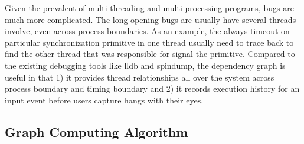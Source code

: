 
Given the prevalent of multi-threading and multi-processing programs, bugs are
much more complicated. The long opening bugs are usually have several threads
involve, even across process boundaries. As an example, the always timeout on
particular synchronization primitive in one thread usually need to trace back to
find the other thread that was responsible for signal the primitive. Compared
to the existing debugging tools like lldb and spindump, the dependency graph is
useful in that 1) it provides thread relationships all over the system across
process boundary and timing boundary and 2) it records execution history for an
input event before users capture hangs with their eyes.

\subsection{Graph Computing Algorithm}\label{subsec:graphcomputing}

